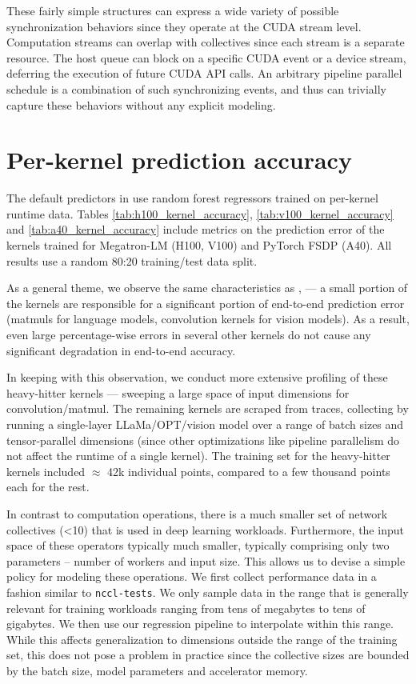 These fairly simple structures can express a wide variety of possible synchronization behaviors since they operate at the CUDA stream level. Computation streams can overlap with collectives since each stream is a separate resource. The host queue can block on a specific CUDA event or a device stream, deferring the execution of future CUDA API calls. An arbitrary pipeline parallel schedule is a combination of such synchronizing events, and thus \sysname can trivially capture these behaviors without any explicit modeling.


\section{Per-kernel prediction accuracy}
\label{appendix:predictions}
The default predictors in \sysname use random forest regressors trained on per-kernel runtime data. Tables \ref{tab:h100_kernel_accuracy}, \ref{tab:v100_kernel_accuracy} and \ref{tab:a40_kernel_accuracy} include metrics on the prediction error of the kernels trained for Megatron-LM (H100, V100) and PyTorch FSDP (A40). All results use a random 80:20 training/test data split.

As a general theme, we observe the same characteristics as \cite{geoffrey2021habitat}, \cite{zhu2020daydream} --- a small portion of the kernels are responsible for a significant portion of end-to-end prediction error (matmuls for language models, convolution kernels for vision models). As a result, even large percentage-wise errors in several other kernels do not cause any significant degradation in end-to-end accuracy.

In keeping with this observation, we conduct more extensive profiling of these heavy-hitter kernels --- sweeping a large space of input dimensions for convolution/matmul. The remaining kernels are scraped from traces, collecting by running a single-layer LLaMa/OPT/vision model over a range of batch sizes and tensor-parallel dimensions (since other optimizations like pipeline parallelism do not affect the runtime of a single kernel). The training set for the heavy-hitter kernels included $\approx$ 42k individual points, compared to a few thousand points each for the rest.




In contrast to computation operations, there is a much smaller set of network collectives (<10) that is used in deep learning workloads. Furthermore, the input space of these operators typically much smaller, typically comprising only two parameters -- number of workers and input size. This allows us to devise a simple policy for modeling these operations. We first  collect performance data in a fashion similar to \texttt{nccl-tests}. We only sample data in the range that is generally relevant for training workloads ranging from tens of megabytes to tens of gigabytes. We then use our regression pipeline to interpolate within this range. While this affects generalization to dimensions outside the range of the training set, this does not pose a problem in practice since the collective sizes are bounded by the batch size, model parameters and accelerator memory. %


